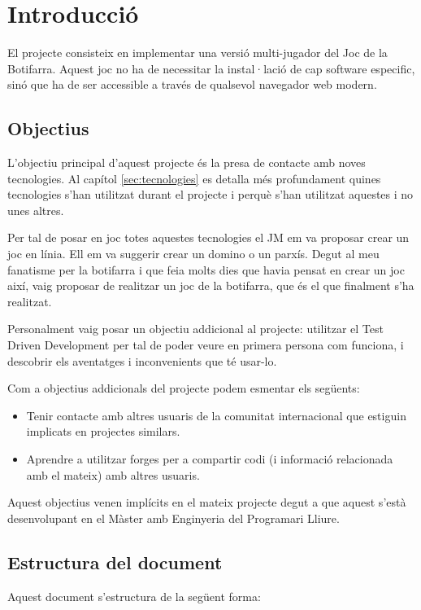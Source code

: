 \chapter{Introducció}

El projecte consisteix en implementar una versió multi-jugador del Joc de la Botifarra. Aquest joc no ha de necessitar la instal·lació de cap software especific, sinó que ha de ser accessible a través de qualsevol navegador web modern.

\section{Objectius}
L'objectiu principal d'aquest projecte és la presa de contacte amb noves tecnologies. Al capítol \ref{sec:tecnologies} es detalla més profundament quines tecnologies s'han utilitzat durant el projecte i perquè s'han utilitzat aquestes i no unes altres. 

Per tal de posar en joc totes aquestes tecnologies el JM em va proposar crear un joc en línia. Ell em va suggerir crear un domino o un parxís. Degut al meu fanatisme per la botifarra i que feia molts dies que havia pensat en crear un joc així, vaig proposar de realitzar un joc de la botifarra, que és el que finalment s'ha realitzat. 

Personalment vaig posar un objectiu addicional al projecte: utilitzar el Test Driven Development per tal de poder veure en primera persona com funciona, i descobrir els aventatges i inconvenients que té usar-lo. 

Com a objectius addicionals del projecte podem esmentar els següents: 
\begin{itemize}
	\item{Tenir contacte amb altres usuaris de la comunitat internacional que estiguin implicats en projectes similars.}
	\item{Aprendre a utilitzar forges per a compartir codi (i informació relacionada amb el mateix) amb altres usuaris.}
\end{itemize} 

Aquest objectius venen implícits en el mateix projecte degut a que aquest s'està desenvolupant en el Màster amb Enginyeria del Programari Lliure. 

\section{Estructura del document}

Aquest document s'estructura de la següent forma: 

